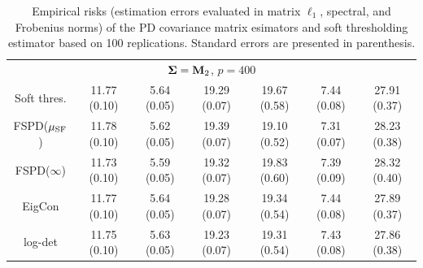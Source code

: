 \documentclass[times,sort&compress,3p]{elsarticle}
\begin{document}
\begin{table}[htb!]
{\begin{center}
\begin{tabular}{c|ccc|ccc}

\multicolumn{7}{c}{${\bf \Sigma} = {\bf M}_2$, $p = 400$} \\
Soft thres. & 11.77 (0.10)  & 5.64 (0.05)  & 19.29 (0.07) & 19.67 (0.58)  & 7.44 (0.08)  & 27.91 (0.37) \\
 FSPD($\mu_{\rm SF}$) & 11.78 (0.10)  & 5.62 (0.05)  & 19.39 (0.07) & 19.10 (0.52)  & 7.31 (0.07)  & 28.23 (0.38) \\
 FSPD($\infty$) & 11.73 (0.10)  & 5.59 (0.05)  & 19.32 (0.07) & 19.83 (0.60)  & 7.39 (0.09)  & 28.32 (0.40) \\
 EigCon & 11.77 (0.10)  & 5.64 (0.05)  & 19.28 (0.07) & 19.34 (0.54)  & 7.44 (0.08)  & 27.89 (0.37) \\
 log-det  & 11.75 (0.10)  & 5.63 (0.05)  & 19.23 (0.07) & 19.31 (0.54)  & 7.43 (0.08)  & 27.86 (0.38) \\
\hline
\end{tabular}
\caption{ Empirical risks (estimation errors evaluated in matrix $\ell_1$, spectral, and Frobenius norms) of the PD covariance matrix esimators and soft thresholding estimator based on 100 replications. Standard errors are presented in parenthesis.}
\label{table:emperrcomp}
\end{center}
}
\end{table}
\end{document}
